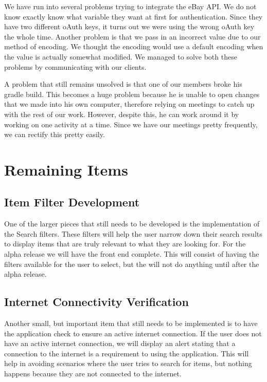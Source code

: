 \documentclass[journal,compsoc, 10pt, draftclsnofoot, onecolumn]{IEEEtran}
\begin{document}
We have run into several problems trying to integrate the eBay API. We do not know 
exactly know what variable they want at first for authentication. Since they have two 
different oAuth keys, it turns out we were using the wrong oAuth key the whole time. 
Another problem is that we pass in an incorrect value due to our method of encoding. 
We thought the encoding would use a default encoding when the value is actually 
somewhat modified. We managed to solve both these problems by communicating 
with our clients. \newline

A problem that still remains unsolved is that one of our members broke his gradle build. 
This becomes a huge problem because he is unable to open changes that we made into 
his own computer, therefore relying on meetings to catch up with the rest of our work. 
However, despite this, he can work around it by working on one activity at a time. Since 
we have our meetings pretty frequently, we can rectify this pretty easily.

\section{Remaining Items}

\subsection{Item Filter Development}
One of the larger pieces that still needs to be developed is the implementation
 of the Search filters. These filters will help the user narrow down their 
search results to display items that are truly relevant to what they are 
looking for. For the alpha release we will have the front end complete. This 
will consist of having the filters available for the user to select, but the 
will not do anything until after the alpha release. 

\subsection{Internet Connectivity Verification}
Another small, but important item that still needs to be implemented is to 
have the application check to ensure an active internet connection. If the 
user does not have an active internet connection, we will display an alert 
stating that a connection to the internet is a requirement to using the 
application.  This will help in avoiding scenarios where the user tries to 
search for items, but nothing happens because they are not connected to the 
internet. 
\end{document}
